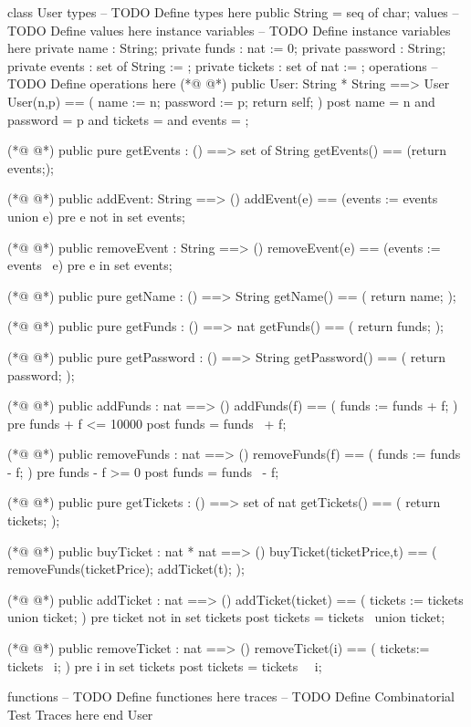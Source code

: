 \begin{vdmpp}[breaklines=true]
class User
types
-- TODO Define types here
  public String = seq of char;
values
-- TODO Define values here
instance variables
-- TODO Define instance variables here
 private name : String;
 private funds : nat := 0;
 private password : String;
 private events : set of String := {};
 private tickets : set of nat := {};
operations
-- TODO Define operations here
(*@
\label{User:16}
@*)
 public User: String * String ==> User
 User(n,p) == (
  name := n;
  password := p;
  return self;
 )
 post name = n and password = p and tickets = {} and events = {};
 
(*@
\label{getEvents:24}
@*)
 public pure getEvents : () ==> set of String
 getEvents() == (return events;);
 
(*@
\label{addEvent:27}
@*)
 public addEvent: String ==> ()
 addEvent(e) == (events := events union {e})
 pre e not in set events;
 
(*@
\label{removeEvent:31}
@*)
 public removeEvent : String ==> ()
 removeEvent(e) == (events := events \ {e})
 pre e in set events;
 
(*@
\label{getName:35}
@*)
 public pure getName : () ==> String
 getName() == (
  return name;
 );
 
(*@
\label{getFunds:40}
@*)
 public pure getFunds : () ==> nat
 getFunds() == (
  return funds;
 );
 
(*@
\label{getPassword:45}
@*)
 public pure getPassword : () ==> String
 getPassword() == (
  return password;
 );
 
(*@
\label{addFunds:50}
@*)
 public addFunds : nat ==> ()
 addFunds(f) == (
  funds := funds + f;
 )
 pre funds + f <= 10000
 post funds = funds~ + f;
 
(*@
\label{removeFunds:57}
@*)
 public removeFunds : nat ==> ()
 removeFunds(f) == (
  funds := funds - f;
 )
 pre funds - f >= 0
 post funds = funds~ - f;
 
(*@
\label{getTickets:64}
@*)
 public pure getTickets : () ==> set of nat
  getTickets() == (
  return tickets;
 );
 
(*@
\label{buyTicket:69}
@*)
 public buyTicket : nat * nat ==> ()
 buyTicket(ticketPrice,t) == (
  removeFunds(ticketPrice);
  addTicket(t);
 );
 
(*@
\label{addTicket:75}
@*)
 public addTicket : nat ==> ()
 addTicket(ticket) == (
  tickets := tickets union {ticket};
 )
 pre ticket not in set tickets
 post tickets = tickets~ union {ticket};
 
(*@
\label{removeTicket:82}
@*)
 public removeTicket : nat ==> ()
 removeTicket(i) == (
  tickets:= tickets \ {i}; 
 )
 pre i in set tickets
 post tickets = tickets~ \ {i}; 
 
functions
-- TODO Define functiones here
traces
-- TODO Define Combinatorial Test Traces here
end User
\end{vdmpp}
